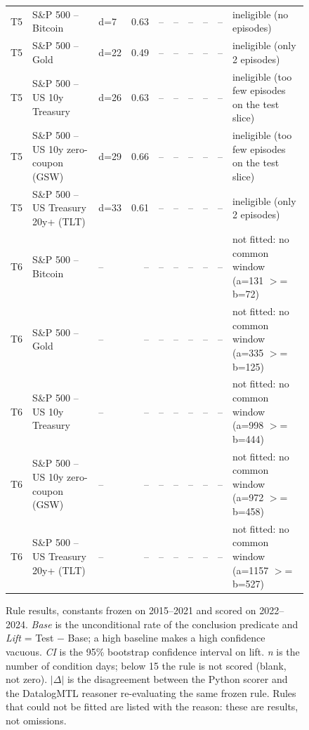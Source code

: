 \begin{figure}
\begin{tabular}{lllrrrrrrl}
T5 & S\&P 500 -- Bitcoin & d=7 & 0.63 & -- & -- & -- & -- & -- & ineligible (no episodes) \\
T5 & S\&P 500 -- Gold & d=22 & 0.49 & -- & -- & -- & -- & -- & ineligible (only 2 episodes) \\
T5 & S\&P 500 -- US 10y Treasury & d=26 & 0.63 & -- & -- & -- & -- & -- & ineligible (too few episodes on the test slice) \\
T5 & S\&P 500 -- US 10y zero-coupon (GSW) & d=29 & 0.66 & -- & -- & -- & -- & -- & ineligible (too few episodes on the test slice) \\
T5 & S\&P 500 -- US Treasury 20y+ (TLT) & d=33 & 0.61 & -- & -- & -- & -- & -- & ineligible (only 2 episodes) \\
T6 & S\&P 500 -- Bitcoin & -- & -- & -- & -- & -- & -- & -- & not fitted: no common window (a=131 $>$= b=72) \\
T6 & S\&P 500 -- Gold & -- & -- & -- & -- & -- & -- & -- & not fitted: no common window (a=335 $>$= b=125) \\
T6 & S\&P 500 -- US 10y Treasury & -- & -- & -- & -- & -- & -- & -- & not fitted: no common window (a=998 $>$= b=444) \\
T6 & S\&P 500 -- US 10y zero-coupon (GSW) & -- & -- & -- & -- & -- & -- & -- & not fitted: no common window (a=972 $>$= b=458) \\
T6 & S\&P 500 -- US Treasury 20y+ (TLT) & -- & -- & -- & -- & -- & -- & -- & not fitted: no common window (a=1157 $>$= b=527) \\
\bottomrule
\end{tabular}
\caption{Rule results, constants frozen on 2015--2021 and scored on 2022--2024. \emph{Base} is the unconditional rate of the conclusion predicate and \emph{Lift} = Test $-$ Base; a high baseline makes a high confidence vacuous. \emph{CI} is the 95\% bootstrap confidence interval on lift. \emph{n} is the number of condition days; below 15 the rule is not scored (blank, not zero). $|\Delta|$ is the disagreement between the Python scorer and the DatalogMTL reasoner re-evaluating the same frozen rule. Rules that could not be fitted are listed with the reason: these are results, not omissions.}
\label{tab:rule-results_classifier}
\end{figure}
